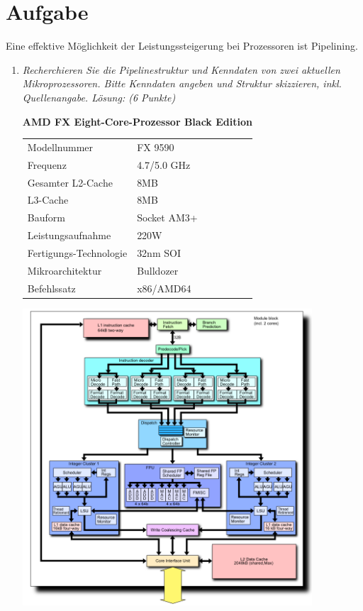 \documentclass[10pt]{article}
\begin{document}
\newpage

\section{Aufgabe}
Eine effektive Möglichkeit der Leistungssteigerung bei Prozessoren ist Pipelining.
\begin{enumerate}[label=\alph*)]
	\item 
	\textit{Recherchieren Sie die Pipelinestruktur und Kenndaten von zwei aktuellen Mikroprozessoren. Bitte Kenndaten angeben und Struktur skizzieren, inkl. Quellenangabe. Lösung: (6 Punkte) }
	
	\textbf{AMD FX Eight-Core-Prozessor Black Edition}\\
	\begin{tabular}{ l l l l l l l }
		Modellnummer & FX 9590\\
		Frequenz & 4.7/5.0 GHz\\
		Gesamter L2-Cache & 8MB\\
		L3-Cache & 8MB\\
		Bauform & Socket AM3+\\
		Leistungsaufnahme & 220W\\
		Fertigungs-Technologie & 32nm SOI\\
		Mikroarchitektur & Bulldozer \\
		Befehlssatz & x86/AMD64 \\
	\end{tabular}
	
	\includegraphics[width=0.85\textwidth]{images/AMD_Bulldozer.png}
	

\end{enumerate}
\end{document}
